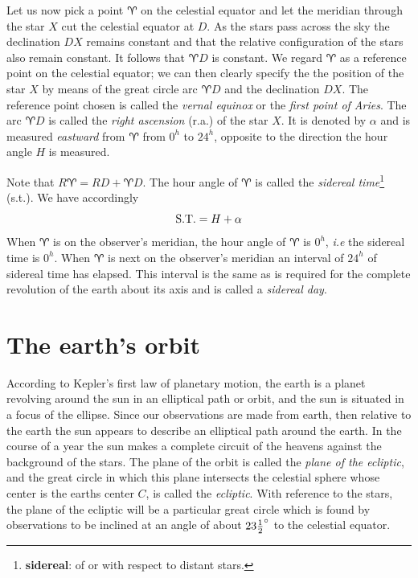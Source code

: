 Let us now pick a point $\aries$ on the celestial equator and let the
meridian through the star $X$ cut the celestial equator at $D$. As the
stars pass across the sky the declination $DX$ remains constant and
that the relative configuration of the stars also remain constant. It
follows that $\aries D$ is constant. We regard $\aries$ as a reference
point on the celestial equator; we can then clearly specify the the
position of the star $X$ by means of the great circle arc $\aries D$
and the declination $DX$. The reference point chosen is called the
{\it vernal equinox} or the {\it first point of Aries}. The arc
$\aries D$ is called the {\it right ascension} ({\sc r.a.}) of the
star $X$. It is denoted by $\alpha$ and is measured {\it eastward}
from $\aries$ from $0^h$ to $24^h$, opposite to the direction the hour
angle $H$ is measured. 

Note that $R\aries =RD+\aries D$. The hour angle of $\aries$ is called
the {\it sidereal time}\footnote{{\bf sidereal}: of or with respect to distant stars.} 
 ({\sc s.t.}). We have accordingly 
\[
{\rm S.T.}=H+\alpha
\]
When $\aries$ is on the observer's meridian, the hour angle of
$\aries$ is $0^h$, {\it i.e} the sidereal time is $0^h$. When $\aries$
is next on the observer's meridian an interval of $24^h$ of sidereal
time has elapsed. This interval is the same as is required for the
complete revolution of the earth about its axis and is called a {\it
  sidereal day}. 

\section{The earth's orbit}

According to Kepler's first law of planetary motion, the earth is a 
planet revolving around the sun in an elliptical path or orbit, and
the sun is situated in a focus of the ellipse. Since our observations
are made from earth, then relative to the earth the sun appears to
describe an elliptical path around the earth. In the course of a year
the sun makes a complete circuit of the heavens against the background
of the stars. The plane of the orbit is called the {\it plane of the
  ecliptic},  and the great circle in which this plane intersects the
celestial sphere whose center is the earths center $C$, is called the 
{\it ecliptic}. With reference to the stars, the plane of the ecliptic
will be a particular great circle which is found by observations to be
inclined at an angle of about $23{1\over 2}^\circ$ to the celestial
equator. 

